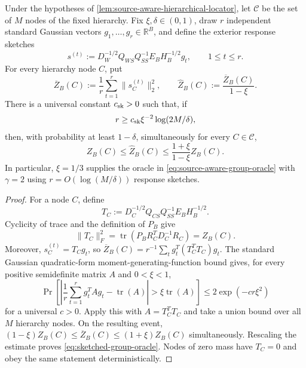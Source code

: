 \begin{lemma}
\label{lem:group-trace-response-sketch}
Under the hypotheses of
\cref{lem:source-aware-hierarchical-locator}, let $\mathcal C$ be the set of
$M$ nodes of the fixed hierarchy.  Fix $\xi,\delta\in(0,1)$, draw
$r$ independent standard Gaussian vectors
$g_1,\ldots,g_r\in\mathbb R^B$, and define the exterior response sketches
\begin{equation}
 s^{(t)}
 :=D_W^{-1/2}Q_{WS}Q_{SS}^{-1}E_BH_B^{-1/2}g_t,
 \qquad 1\leq t\leq r.
 \label{eq:source-normalized-response-sketch}
\end{equation}
For every hierarchy node $C$, put
\begin{equation}
 \overline Z_B(C)
 :=\frac1r\sum_{t=1}^r\|s_C^{(t)}\|_2^2,
 \qquad
 \widehat Z_B(C):=\frac{\overline Z_B(C)}{1-\xi}.
 \label{eq:sketched-group-trace}
\end{equation}
There is a universal constant $c_{\rm sk}>0$ such that, if
\begin{equation}
 r\geq c_{\rm sk}\xi^{-2}\log(2M/\delta),
 \label{eq:group-trace-sketch-count}
\end{equation}
then, with probability at least $1-\delta$, simultaneously for every
$C\in\mathcal C$,
\begin{equation}
 Z_B(C)\leq\widehat Z_B(C)
 \leq\frac{1+\xi}{1-\xi}Z_B(C).
 \label{eq:sketched-group-oracle}
\end{equation}
In particular, $\xi=1/3$ supplies the oracle in
\cref{eq:source-aware-group-oracle} with $\gamma=2$ using
$r=O(\log(M/\delta))$ response sketches.
\end{lemma}

\begin{proof}
For a node $C$, define
\begin{equation*}
 T_C:=D_C^{-1/2}Q_{CS}Q_{SS}^{-1}E_BH_B^{-1/2}.
\end{equation*}
Cyclicity of trace and the definition of $P_B$ give
\begin{equation*}
 \|T_C\|_F^2
 =\operatorname{tr}\!\left(P_BR_C^TD_C^{-1}R_C\right)
 =Z_B(C).
\end{equation*}
Moreover, $s_C^{(t)}=T_Cg_t$, so
$\overline Z_B(C)=r^{-1}\sum_tg_t^T(T_C^TT_C)g_t$.  The standard Gaussian
quadratic-form moment-generating-function bound gives, for every positive
semidefinite matrix $A$ and $0<\xi<1$,
\begin{equation*}
 \Pr\!\left[
  \left|\frac1r\sum_{t=1}^rg_t^TAg_t-\operatorname{tr}(A)\right|
  >\xi\operatorname{tr}(A)
 \right]
 \leq2\exp(-c r\xi^2)
\end{equation*}
for a universal $c>0$.  Apply this with $A=T_C^TT_C$ and take a union bound
over all $M$ hierarchy nodes.  On the resulting event,
$(1-\xi)Z_B(C)\leq\overline Z_B(C)\leq
(1+\xi)Z_B(C)$ simultaneously.  Rescaling the estimate proves
\cref{eq:sketched-group-oracle}.  Nodes of zero mass have $T_C=0$ and obey
the same statement deterministically.
\end{proof}


